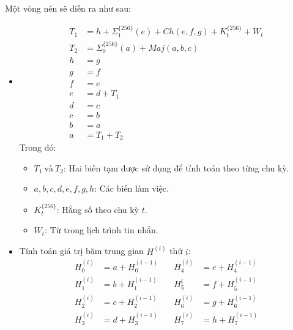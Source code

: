 \begin{enumerate}[label=\textbf{Bước \arabic*:}, leftmargin = 2.5cm]
{Một vòng nén sẽ diễn ra như sau:
\begin{itemize}
	\item 	\begin{align*}
		T_1 &= h + \Sigma_1^{\{256\}}(e)+Ch(e,f,g)+K_t^{\{256\}}+ W_t \\
		T_2 &= \Sigma_0^{\{256\}}(a) + Maj(a,b,c) \\
		h &= g \\
		g &= f \\
		f &= e \\
		e &= d + T_1 \\
		d &= c\\
		c &= b\\
		b &= a\\
		a &= T_1 + T_2
	\end{align*}
	Trong đó:
	\begin{itemize}
		\item $T_1~ \text{và} ~T_2$: Hai biến tạm được sử dụng để tính toán theo từng chu kỳ.
		\item $a,b,c,d,e,f,g,h$: Các biến làm việc.
		\item $K_t^{\{256\}}$: Hằng số theo chu kỳ $t$.
		\item $W_t$: Từ trong lịch trình tin nhắn.
	\end{itemize}
	\item Tính toán giá trị băm trung gian $H^{(i)}$ thứ $i$:
	\begin{align*}
		H_0^{(i)} &= a + H_0^{(i-1)} \quad & H_4^{(i)} &= e + H_4^{(i-1)} \\
		H_1^{(i)} &= b + H_1^{(i-1)} \quad & H_5^{i} &= f + H_5^{(i-1)} \\
		H_2^{(i)} &= c + H_2^{(i-1)} \quad & H_6^{(i)} &= g + H_6^{(i-1)} \\
		H_3^{(i)} &= d + H_3^{(i-1)} \quad & H_7^{(i)} &= h + H_7^{(i-1)}
	\end{align*}
\end{itemize}

}
\end{enumerate}
